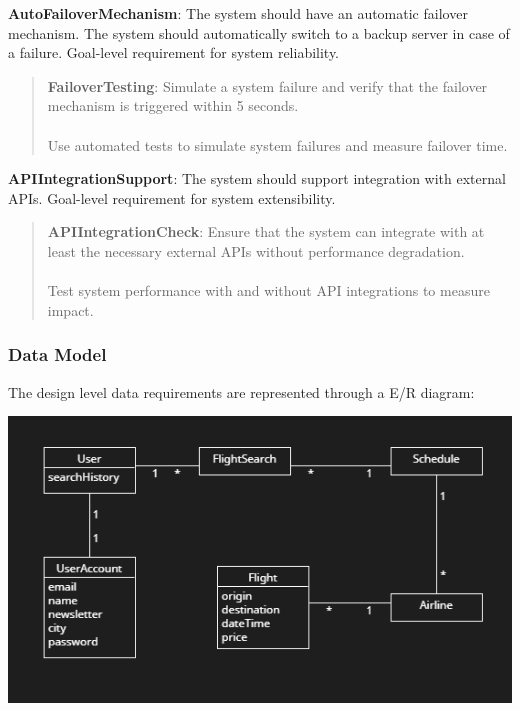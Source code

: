 \textbf{AutoFailoverMechanism}: The system should have an automatic failover mechanism. The system should automatically switch to a backup server in case of a failure. Goal-level requirement for system reliability.
\begin{quote}
    \textbf{FailoverTesting}: Simulate a system failure and verify that the failover mechanism is triggered within 5 seconds. \\ \\
    Use automated tests to simulate system failures and measure failover time.
\end{quote}
\textbf{APIIntegrationSupport}: The system should support integration with external APIs. Goal-level requirement for system extensibility.
\begin{quote}
    \textbf{APIIntegrationCheck}: Ensure that the system can integrate with at least the necessary external APIs without performance degradation. \\ \\
    Test system performance with and without API integrations to measure impact.
\end{quote}

\subsubsection{Data Model}
The design level data requirements are represented through a E/R diagram:

\includegraphics[width=1\textwidth]{resources/dataRelations.PNG}

